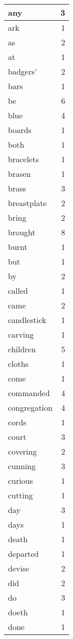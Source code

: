 \begin{center}
\begin{longtable}{l|r}
any & 3 \\ \hline
ark & 1 \\ \hline
as & 2 \\ \hline
at & 1 \\ \hline
badgers' & 2 \\ \hline
bars & 1 \\ \hline
be & 6 \\ \hline
blue & 4 \\ \hline
boards & 1 \\ \hline
both & 1 \\ \hline
bracelets & 1 \\ \hline
brasen & 1 \\ \hline
brass & 3 \\ \hline
breastplate & 2 \\ \hline
bring & 2 \\ \hline
brought & 8 \\ \hline
burnt & 1 \\ \hline
but & 1 \\ \hline
by & 2 \\ \hline
called & 1 \\ \hline
came & 2 \\ \hline
candlestick & 1 \\ \hline
carving & 1 \\ \hline
children & 5 \\ \hline
cloths & 1 \\ \hline
come & 1 \\ \hline
commanded & 4 \\ \hline
congregation & 4 \\ \hline
cords & 1 \\ \hline
court & 3 \\ \hline
covering & 2 \\ \hline
cunning & 3 \\ \hline
curious & 1 \\ \hline
cutting & 1 \\ \hline
day & 3 \\ \hline
days & 1 \\ \hline
death & 1 \\ \hline
departed & 1 \\ \hline
devise & 2 \\ \hline
did & 2 \\ \hline
do & 3 \\ \hline
doeth & 1 \\ \hline
done & 1 \\ \hline

\end{longtable}
\end{center}
